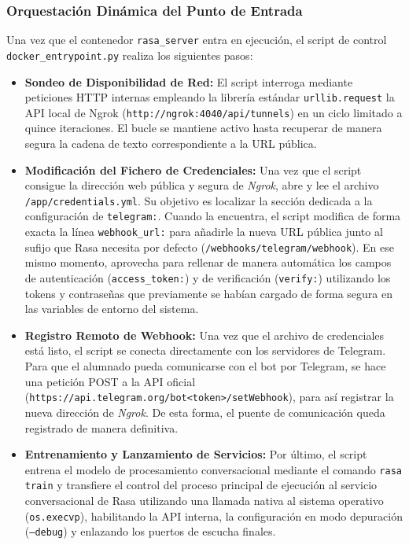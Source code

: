 \documentclass[a4paper,12pt,twoside,final]{book}
\begin{document}
\subsubsection{Orquestación Dinámica del Punto de Entrada}
Una vez que el contenedor \texttt{rasa\_server} entra en ejecución, el script de control \texttt{docker\_entrypoint.py} realiza los siguientes pasos:
\begin{itemize}
    \item \textbf{Sondeo de Disponibilidad de Red:} El script interroga mediante peticiones HTTP internas empleando la librería estándar \texttt{urllib.request} la API local de Ngrok (\texttt{http://ngrok:4040/api/tunnels}) en un ciclo limitado a quince iteraciones. El bucle se mantiene activo hasta recuperar de manera segura la cadena de texto correspondiente a la URL pública.
    
    \item \textbf{Modificación del Fichero de Credenciales:} Una vez que el script consigue la dirección web pública y segura de \textit{Ngrok}, abre y lee el archivo \texttt{/app/credentials.yml}. Su objetivo es localizar la sección dedicada a la configuración de \texttt{telegram:}. Cuando la encuentra, el script modifica de forma exacta la línea \texttt{webhook\_url:} para añadirle la nueva URL pública junto al sufijo que Rasa necesita por defecto (\texttt{/webhooks/telegram/webhook}). En ese mismo momento, aprovecha para rellenar de manera automática los campos de autenticación (\texttt{access\_token:}) y de verificación (\texttt{verify:}) utilizando los tokens y contraseñas que previamente se habían cargado de forma segura en las variables de entorno del sistema.
    
    \item \textbf{Registro Remoto de Webhook:} Una vez que el archivo de credenciales está listo, el script se conecta directamente con los servidores de Telegram. Para que el alumnado pueda comunicarse con el bot por Telegram, se hace una petición POST a la API oficial (\texttt{https://api.telegram.org/bot<token>/setWebhook}), para así registrar la nueva dirección de \textit{Ngrok}. De esta forma, el puente de comunicación queda registrado de manera definitiva.
    
    \item \textbf{Entrenamiento y Lanzamiento de Servicios:} Por último, el script entrena el modelo de procesamiento conversacional mediante el comando \texttt{rasa train} y transfiere el control del proceso principal de ejecución al servicio conversacional de Rasa utilizando una llamada nativa al sistema operativo (\texttt{os.execvp}), habilitando la API interna, la configuración en modo depuración (\texttt{--debug}) y enlazando los puertos de escucha finales.
\end{itemize}
\end{document}
